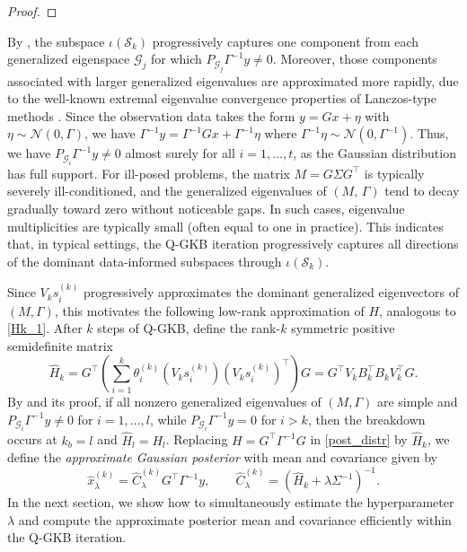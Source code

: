 \documentclass[]{myarticle}
\begin{document}
\begin{proof}
\end{proof}

By , the subspace $\iota(\mathcal S_k)$ progressively captures one component from each generalized eigenspace $\mathcal G_j$ for which $P_{\mathcal G_j}\Gamma^{-1}y \neq 0$. Moreover, those components associated with larger generalized eigenvalues are approximated more rapidly, due to the well-known extremal eigenvalue convergence properties of Lanczos-type methods \cite{saad2011numerical}. Since the observation data takes the form $y = Gx + \eta$ with $\eta\sim\mathcal N(0,\Gamma)$, we have $\Gamma^{-1}y = \Gamma^{-1}Gx + \Gamma^{-1}\eta$ where $\Gamma^{-1}\eta \sim \mathcal N(0,\Gamma^{-1})$. Thus, we have $P_{\mathcal G_i}\Gamma^{-1}y \neq 0$ almost surely for all $i=1,\dots,t$, as the Gaussian distribution has full support. For ill-posed problems, the matrix $M=G\Sigma G^\top$ is typically severely ill-conditioned, and the generalized eigenvalues of $(M,\,\Gamma)$ tend to decay gradually toward zero without noticeable gaps. In such cases, eigenvalue multiplicities are typically small (often equal to one in practice). This indicates that, in typical settings, the Q-GKB iteration progressively captures all directions of the dominant data-informed subspaces through $\iota(\mathcal S_k)$.

Since $V_k s_i^{(k)}$ progressively approximates the dominant generalized eigenvectors of $(M,\Gamma)$, this motivates the following low-rank approximation of $H$, analogous to \cref{Hk_1}. After $k$ steps of Q-GKB, define the rank-$k$ symmetric positive semidefinite matrix
\begin{equation}
  \widehat{H}_k = G^{\top} \left(\sum_{i=1}^{k}\theta_{i}^{(k)}(V_{k}s_{i}^{(k)})(V_{k}s_{i}^{(k)})^{\top}\right)G = G^{\top}V_{k}B_{k}^{\top}B_{k}V_{k}^{\top}G .
\end{equation}
By  and its proof, if all nonzero generalized eigenvalues of $(M,\Gamma)$ are simple and $P_{\mathcal G_i}\Gamma^{-1}y \neq 0$ for $i=1,\dots,l$, while $P_{\mathcal G_i}\Gamma^{-1}y = 0$ for $i>k$, then the breakdown occurs at $k_b=l$ and $\widehat{H}_l = H_l$. Replacing $H=G^{\top}\Gamma^{-1}G$ in \cref{post_distr} by $\widehat{H}_k$, we define the \emph{approximate Gaussian posterior} with mean and covariance given by
\begin{equation}\label{approx_post_distr}
  \widehat{x}_{\lambda}^{(k)} = \widehat{C}_{\lambda}^{(k)}G^{\top}\Gamma^{-1}y, 
  \qquad
  \widehat{C}_{\lambda}^{(k)} = (\widehat{H}_k+\lambda\Sigma^{-1})^{-1}.
\end{equation}
In the next section, we show how to simultaneously estimate the hyperparameter $\lambda$ and compute the approximate posterior mean and covariance efficiently within the Q-GKB iteration.
\end{document}
